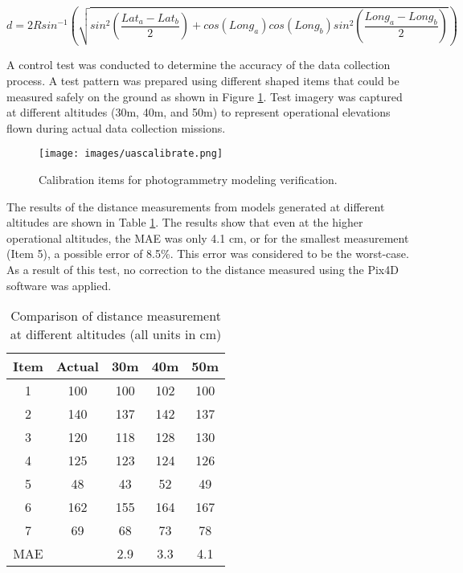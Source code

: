 \documentclass[preprint,12pt,a4paper]{elsarticle}
\begin{document}
\begin{linenumbers}
\begin{equation}
\label{eq:distHaversine}
d = 2Rsin^{-1}\left (\sqrt{ sin^{2}\left ( \frac{Lat_{a}-Lat_{b}}{2} \right ) + cos(Long_{a})cos(Long_{b})sin^{2} \left ( \frac{Long_{a}-Long_{b}}{2} \right ) } \right )
\end{equation}

A control test was conducted to determine the accuracy of the data collection process. A test pattern was prepared using different shaped items that could be measured safely on the ground as shown in Figure \ref{fig:uascalibration}. Test imagery was captured at different altitudes (30m, 40m, and 50m) to represent operational elevations flown during actual data collection missions.

\begin{figure}[H]
\texttt{[image: images/uascalibrate.png]} 
\caption{Calibration items for photogrammetry modeling verification.}
\label{fig:uascalibration}
\end{figure}

The results of the distance measurements from models generated at different altitudes are shown in Table \ref{tab:uascalibrate}. The results show that even at the higher operational altitudes, the MAE was only 4.1 cm, or for the smallest measurement (Item 5), a possible error of 8.5\%. This error was considered to be the worst-case. As a result of this test, no correction to the distance measured using the Pix4D software was applied.

%
\begin{table}[H]
\centering
\caption[Comparison of distance measurement at different altitudes]{Comparison of distance measurement at different altitudes (all units in cm)}
\label{tab:uascalibrate}
\begin{tabular}{@{}ccccc@{}}
\toprule
\textbf{Item} & \textbf{Actual} & \textbf{30m} & \textbf{40m} & \textbf{50m} \\ \midrule
1 & 100 & 100 & 102 & 100 \\
2 & 140 & 137 & 142 & 137 \\
3 & 120 & 118 & 128 & 130 \\
4 & 125 & 123 & 124 & 126 \\
5 & 48 & 43 & 52 & 49 \\
6 & 162 & 155 & 164 & 167 \\
7 & 69 & 68 & 73 & 78 \\
MAE &  & 2.9 & 3.3 & 4.1 \\ \bottomrule
\end{tabular}
\end{table}



\end{linenumbers}
\end{document}
